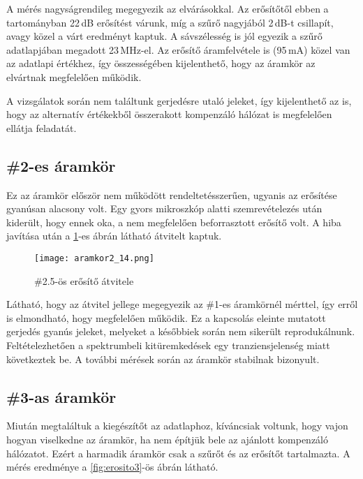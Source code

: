 A mérés nagyságrendileg megegyezik az elvárásokkal. Az erősítőtől ebben a tartományban 22\,dB erősítést várunk, míg a szűrő nagyjából 2\,dB-t csillapít, avagy közel a várt eredményt kaptuk. A sávszélesség is jól egyezik a szűrő adatlapjában\cite{SAW} megadott 23\,MHz-el. Az erősítő áramfelvétele is (95\,mA) közel van az adatlapi\cite{PGA} értékhez, így összességében kijelenthető, hogy az áramkör az elvártnak megfelelően működik.

A vizsgálatok során nem találtunk gerjedésre utaló jeleket, így kijelenthető az is, hogy az alternatív értékekből összerakott kompenzáló hálózat is megfelelően ellátja feladatát.



\subsection{\#2-es áramkör}
\label{subsec:2es_aramkor}

Ez az áramkör először nem működött rendeltetésszerűen, ugyanis az erősítése gyanúsan alacsony volt. Egy gyors mikroszkóp alatti szemrevételezés után kiderült, hogy ennek oka, a nem megfelelően beforrasztott erősítő volt. A hiba javítása után a \ref{fig:erosito2}-es ábrán látható átvitelt kaptuk.

\begin{figure}[!ht]
	\centering
	\texttt{[image: aramkor2\_14.png]}
	\caption{\#2.5-ös erősítő átvitele}
	\label{fig:erosito2}
\end{figure}

Látható, hogy az átvitel jellege megegyezik az \#1-es áramkörnél mérttel, így erről is elmondható, hogy megfelelően működik. Ez a kapcsolás eleinte mutatott gerjedés gyanús jeleket, melyeket a későbbiek során nem sikerült reprodukálnunk. Feltételezhetően a spektrumbeli kitüremkedések egy tranziensjelenség miatt következtek be. A további mérések során az áramkör stabilnak bizonyult.


\subsection{\#3-as áramkör}
\label{3as_aramkor}

Miután megtaláltuk a kiegészítőt az adatlaphoz\cite{PGA_comp}, kíváncsiak voltunk, hogy vajon hogyan viselkedne az áramkör, ha nem építjük bele az ajánlott kompenzáló hálózatot. Ezért a harmadik áramkör csak a szűrőt és az erősítőt tartalmazta. A mérés eredménye a \ref{fig:erosito3}-ös ábrán látható.

